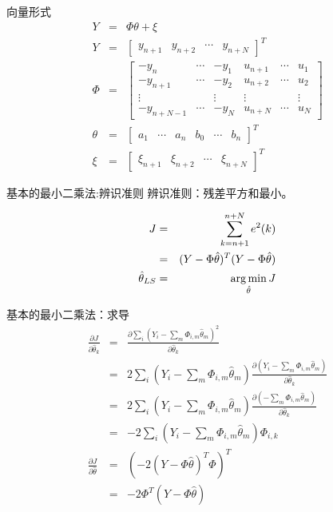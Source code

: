\begin{frame}{向量形式}
\begin{eqnarray*}
Y &=& \Phi \theta + \xi \\
Y &=& \begin{bmatrix}  y_{n+1} & y_{n+2} & \cdots & y_{n+N}  \end{bmatrix}^T  \\
\Phi &=& \begin{bmatrix}
-y_{n}    & \cdots & -y_{1}   & u_{n+1} & \cdots & u_{1}  \\
-y_{n+1}  & \cdots & -y_{2}   & u_{n+2} & \cdots & u_{2}  \\
\vdots   &        & \vdots  & \vdots &        & \vdots \\
-y_{n+N-1} & \cdots & -y_{N}   & u_{n+N} & \cdots & u_{N}
\end{bmatrix} \\
\theta &=& \begin{bmatrix}a_1 & \cdots & a_n & b_0 & \cdots & b_n \end{bmatrix}^T\\
\xi &=& \begin{bmatrix}  \xi_{n+1} &  \xi_{n+2} & \cdots & \xi_{n+N} \end{bmatrix}^T
\end{eqnarray*}
\end{frame}

\begin{frame}{基本的最小二乘法:辨识准则}
辨识准则：残差平方和最小。

\begin{eqnarray*}
J &=& \sum_{k=n+1}^{n+N}e^2(k)  \\
&=& (Y-\Phi\hat\theta)^T(Y-\Phi\hat\theta) \\
\hat\theta_{LS} &=& \operatorname*{arg\,min}_{\hat\theta} J
\end{eqnarray*}
\end{frame}

\begin{frame}{基本的最小二乘法：求导}
\begin{eqnarray*}
\frac{\partial J}{\partial \hat\theta_k} &=& \frac{\partial \sum_i(Y_i-\sum_m\Phi_{i,m}\hat\theta_m)^2}{\partial\hat\theta_k}  \\
&=& 2\sum_i(Y_i-\sum_m\Phi_{i,m}\hat\theta_m)\frac{\partial (Y_i-\sum_m\Phi_{i,m}\hat\theta_m)}{\partial\hat\theta_k} \\
&=& 2\sum_i(Y_i-\sum_m\Phi_{i,m}\hat\theta_m)\frac{\partial(-\sum_m\Phi_{i,m}\hat\theta_m)}{\partial\hat\theta_k} \\
&=& -2\sum_i(Y_i-\sum_m\Phi_{i,m}\hat\theta_m)\Phi_{i,k} \\
\frac{\partial J}{\partial \hat\theta}&=& (-2(Y-\Phi\hat\theta)^T\Phi)^T \\
&=& -2\Phi^T(Y-\Phi\hat\theta) 
\end{eqnarray*}
\end{frame}

